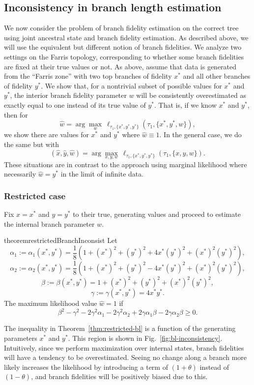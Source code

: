 \documentclass{article}
\begin{document}
\subsection*{Inconsistency in branch length estimation}

We now consider the problem of branch fidelity estimation on the correct tree using joint ancestral state and branch fidelity estimation.
As described above, we will use the equivalent but different notion of branch fidelities.
We analyze two settings on the Farris topology, corresponding to whether some branch fidelities are fixed at their true values or not.
As above, assume that data is generated from the ``Farris zone'' with two top branches of fidelity $x^*$ and all other branches of fidelity $y^*$.
We show that, for a nontrivial subset of possible values for $x^*$ and $y^*$, the interior branch fidelity parameter $w$ will be consistently overestimated as exactly equal to one instead of its true value of $y^*$.
That is, if we know $x^*$ and $y^*$, then for
$$
\hat{w} = \arg\max_{w} \ \ell_{\tau_1,\{x^*,y^*,y^*\}}(\tau_1, \{x^*,y^*,w\}),
$$
we show there are values for $x^*$ and $y^*$ where $\hat{w}\equiv 1$.
In the general case, we do the same but with
$$
(\hat{x}, \hat{y}, \hat{w}) = \arg\max_{x,y,w} \ \ell_{\tau_1,\{x^*,y^*,y^*\}}(\tau_1, \{x,y,w\}).
$$
These situations are in contrast to the approach using marginal likelihood where necessarily $\hat{w}=y^*$ in the limit of infinite data.

\subsubsection*{Restricted case}

Fix $x=x^*$ and $y=y^*$ to their true, generating values and proceed to estimate the internal branch parameter $w$.
\begin{restatable}{theorem}{restrictedBranchInconsist}
\label{thm:restricted-bl}
Let
$$
\alpha_1 := \alpha_1(x^*, y^*) = \frac{1}{8} \left(1+(x^*)^2+(y^*)^2+4x^*(y^*)^2+(x^*)^2(y^*)^2\right),
$$
$$
\alpha_2 := \alpha_2(x^*, y^*) = \frac{1}{8}\left(1+(x^*)^2+(y^*)^2-4x^*(y^*)^2+(x^*)^2(y^*)^2\right),
$$
$$
\beta := \beta(x^*, y^*) = 1+(x^*)^2+(y^*)^2+(x^*)^2(y^*)^2,
$$
$$
\gamma := \gamma(x^*, y^*) = 4x^*y^*.
$$
The maximum likelihood value $\hat{w} = 1$ if
$$
\beta^2-\gamma^2-2\gamma^2\alpha_1-2\gamma^2\alpha_2+2\gamma\alpha_1\beta-2\gamma\alpha_2\beta \ge 0.
$$
\end{restatable}
The inequality in Theorem~\ref{thm:restricted-bl} is a function of the generating parameters $x^*$ and $y^*$.
This region is shown in Fig.~\ref{fig:bl-inconsistency}.
Intuitively, since we perform maximization over internal states, branch fidelities will have a tendency to be overestimated.
Seeing no change along a branch more likely increases the likelihood by introducing a term of $(1+\theta)$ instead of $(1-\theta)$, and branch fidelities will be positively biased due to this.
\end{document}
